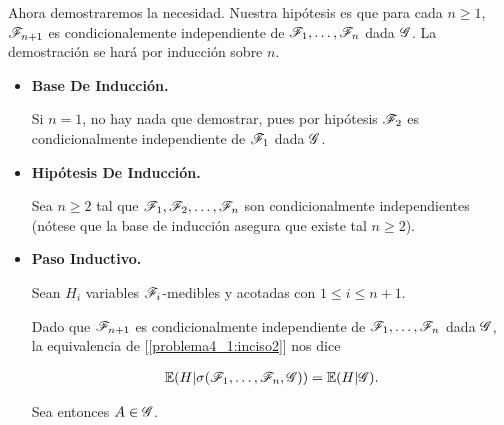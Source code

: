 Ahora demostraremos la necesidad. Nuestra hipótesis es que para cada $n \geq 1$, $\mathscr{F}_{n+1}$ 
es condicionalemente independiente de $\mathscr{F}_1, \dots, \mathscr{F}_n$ dada $\mathscr{G}$. La demostración se hará por 
inducción sobre $n$.\pn

\begin{itemize}
	\item 
        \textbf{Base De Inducción.}
        
        Si $n = 1$, no hay nada que demostrar, pues por hipótesis $\mathscr{F}_2$ es condicionalmente independiente de $\mathscr{F}_1$ dada $\mathscr{G}$.\pn
        
    \item
        \textbf{Hipótesis De Inducción.}
        
        Sea $n \geq 2$ tal que $\mathscr{F}_1, \mathscr{F}_2, \dots, \mathscr{F}_n$ son condicionalmente independientes (nótese que la base de inducción 
        asegura que existe tal $n \geq 2$).\pn
        
    \item
        \textbf{Paso Inductivo.}
        
        Sean $H_i$ variables $\mathscr{F}_{i}$-medibles y acotadas con $1 \leq i \leq n+1$.\pn 
        
        Dado que $\mathscr{F}_{n + 1}$ es condicionalmente independiente de $\mathscr{F}_1, \dots, \mathscr{F}_n$ dada $\mathscr{G}$, la 
        equivalencia de [\ref{problema4_1:inciso2}] nos dice
        
        \begin{align}
            \mathbb{E}(H | \sigma(\mathscr{F}_1, \dots, \mathscr{F}_n, \mathscr{G})) = \mathbb{E}(H | \mathscr{G}). \label{problema4_1:equivalencia_necesidad_4_1_3}
        \end{align}\pn

        Sea entonces $A \in \mathscr{G}$.
        

\end{itemize}
